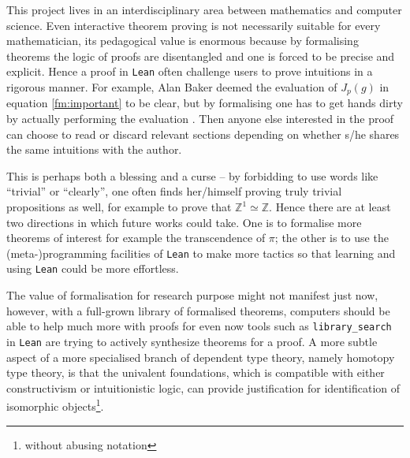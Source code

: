 \documentclass{report}
\theoremstyle{definition}
\begin{document}
This project lives in an interdisciplinary area between mathematics and computer science. Even interactive theorem proving is not necessarily suitable for every mathematician, its pedagogical value is enormous because by formalising theorems the logic of proofs are disentangled and one is forced to be precise and explicit. Hence a proof in {\tt \small Lean} often challenge users to prove intuitions in a rigorous manner. For example, Alan Baker deemed the evaluation of $J_p(g)$ in equation \ref{fm:important} to be clear, but by formalising one has to get hands dirty by actually performing the evaluation \cite{baker1990transcendental}. Then anyone else interested in the proof can choose to read or discard relevant sections depending on whether s/he shares the same intuitions with the author.

This is perhaps both a blessing and a curse -- by forbidding to use words like ``trivial'' or ``clearly'', one often finds her/himself proving truly trivial propositions as well, for example to prove that $\mathbb Z^1\simeq \mathbb Z$. Hence there are at least two directions in which future works could take. One is to formalise more theorems of interest for example the transcendence of $\pi$; the other is to use the (meta-)programming facilities of {\tt\small Lean} to make more tactics so that learning and using {\tt\small Lean} could be more effortless.

The value of formalisation for research purpose might not manifest just now, however, with a full-grown library of formalised theorems, computers should be able to help much more with proofs for even now tools such as {\tt\small library\_search} in {\tt\small Lean} are trying to actively synthesize theorems for a proof. A more subtle aspect of a more specialised branch of dependent type theory, namely homotopy type theory, is that the univalent foundations, which is compatible with either constructivism or intuitionistic logic, can provide justification for identification of isomorphic objects\footnote{without abusing notation}\cite{hottbook}.


%


\nocite{*}
\printbibliography[heading=bibintoc]


\end{document}
